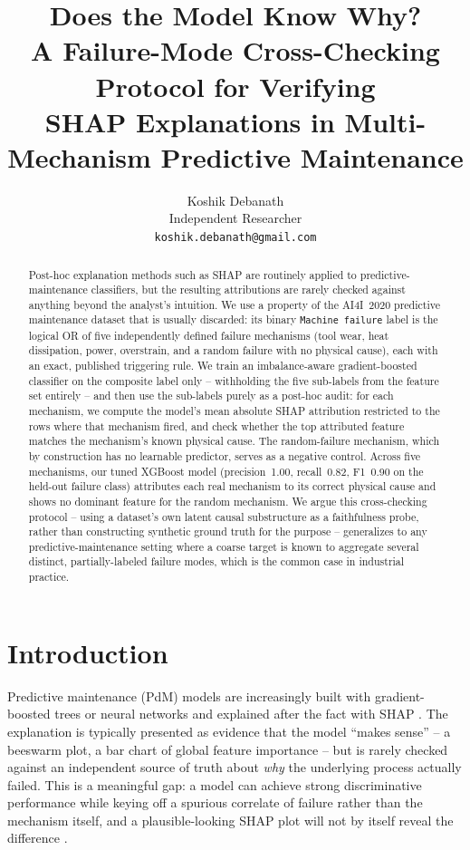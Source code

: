 \documentclass[11pt]{article}
\title{Does the Model Know Why?\\
A Failure-Mode Cross-Checking Protocol for Verifying\\
SHAP Explanations in Multi-Mechanism Predictive Maintenance}
\author{
  Koshik Debanath \\
  \small Independent Researcher \\
  \small \texttt{koshik.debanath@gmail.com}
}
\date{}
\begin{document}
\maketitle

\begin{abstract}
Post-hoc explanation methods such as SHAP are routinely applied to predictive-maintenance
classifiers, but the resulting attributions are rarely checked against anything beyond the
analyst's intuition. We use a property of the AI4I~2020 predictive maintenance dataset that is
usually discarded: its binary \texttt{Machine failure} label is the logical OR of five
independently defined failure mechanisms (tool wear, heat dissipation, power, overstrain, and a
random failure with no physical cause), each with an exact, published triggering rule. We train an
imbalance-aware gradient-boosted classifier on the composite label only -- withholding the five
sub-labels from the feature set entirely -- and then use the sub-labels purely as a post-hoc audit:
for each mechanism, we compute the model's mean absolute SHAP attribution restricted to the rows
where that mechanism fired, and check whether the top attributed feature matches the mechanism's
known physical cause. The random-failure mechanism, which by construction has no learnable
predictor, serves as a negative control. Across five mechanisms, our tuned XGBoost model
(precision~1.00, recall~0.82, F1~0.90 on the held-out failure class) attributes each real mechanism
to its correct physical cause and shows no dominant feature for the random mechanism. We argue this
cross-checking protocol -- using a dataset's own latent causal substructure as a faithfulness probe,
rather than constructing synthetic ground truth for the purpose -- generalizes to any
predictive-maintenance setting where a coarse target is known to aggregate several distinct,
partially-labeled failure modes, which is the common case in industrial practice.
\end{abstract}

\section{Introduction}

Predictive maintenance (PdM) models are increasingly built with gradient-boosted trees or neural
networks and explained after the fact with SHAP \citep{lundberg2017shap}. The explanation is
typically presented as evidence that the model ``makes sense'' -- a beeswarm plot, a bar chart of
global feature importance -- but is rarely checked against an independent source of truth about
\emph{why} the underlying process actually failed. This is a meaningful gap: a model can achieve
strong discriminative performance while keying off a spurious correlate of failure rather than the
mechanism itself, and a plausible-looking SHAP plot will not by itself reveal the difference
\citep{vollert2024survey}.
\end{document}
